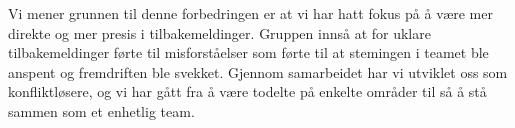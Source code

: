 Vi mener grunnen til denne forbedringen er at vi har hatt fokus på å være mer direkte og mer presis i tilbakemeldinger.
Gruppen innså at for uklare tilbakemeldinger førte til misforståelser som førte til at stemingen i teamet ble anspent og fremdriften ble
svekket. Gjennom samarbeidet har vi utviklet oss som konfliktløsere, og vi har gått fra å være todelte på enkelte områder
til så å stå sammen som et enhetlig team.